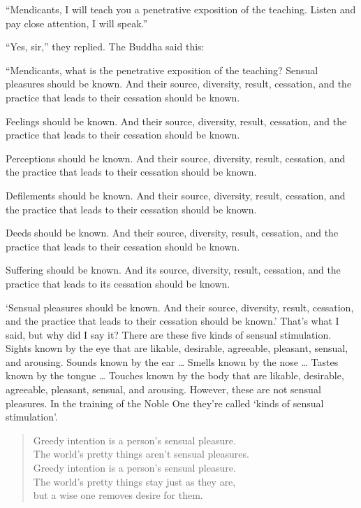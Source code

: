 \documentclass[12pt,openany]{book}%
\begin{document}
“Mendicants, I will teach you a penetrative exposition of the teaching. Listen and pay close attention, I will speak.” 

“Yes, sir,” they replied. The Buddha said this: 

“Mendicants, what is the penetrative exposition of the teaching? Sensual pleasures should be known. And their source, diversity, result, cessation, and the practice that leads to their cessation should be known. 

Feelings should be known. And their source, diversity, result, cessation, and the practice that leads to their cessation should be known. 

Perceptions should be known. And their source, diversity, result, cessation, and the practice that leads to their cessation should be known. 

Defilements should be known. And their source, diversity, result, cessation, and the practice that leads to their cessation should be known. 

Deeds should be known. And their source, diversity, result, cessation, and the practice that leads to their cessation should be known. 

Suffering should be known. And its source, diversity, result, cessation, and the practice that leads to its cessation should be known. 

‘Sensual pleasures should be known. And their source, diversity, result, cessation, and the practice that leads to their cessation should be known.’ That’s what I said, but why did I say it? There are these five kinds of sensual stimulation. Sights known by the eye that are likable, desirable, agreeable, pleasant, sensual, and arousing. Sounds known by the ear … Smells known by the nose … Tastes known by the tongue … Touches known by the body that are likable, desirable, agreeable, pleasant, sensual, and arousing. However, these are not sensual pleasures. In the training of the Noble One they’re called ‘kinds of sensual stimulation’. 

\begin{verse}%
Greedy intention is a person’s sensual pleasure. \\
The world’s pretty things aren’t sensual pleasures. \\
Greedy intention is a person’s sensual pleasure. \\
The world’s pretty things stay just as they are, \\
but a wise one removes desire for them. 

%
\end{verse}
\end{document}
